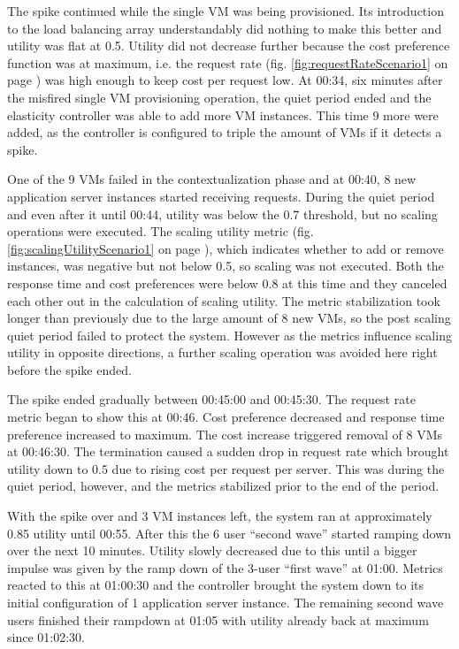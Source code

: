 \documentclass[english]{tktltiki2}
\theoremstyle{definition}
\theoremstyle{remark}
\begin{document}
The spike continued while the single VM was being provisioned. Its introduction
to the load balancing array understandably did nothing to make this better and
utility was flat at 0.5. Utility did not decrease further because the cost
preference function was at maximum, i.e. the request rate (fig.
\ref{fig:requestRateScenario1} on page \pageref{fig:requestRateScenario1}) was
high enough to keep cost per request low. At 00:34, six minutes after the
misfired single VM provisioning operation, the quiet period ended and the
elasticity controller was able to add more VM instances. This time 9 more were
added, as the controller is configured to triple the amount of VMs if it detects
a spike.

One of the 9 VMs failed in the contextualization phase and at 00:40, 8 new
application server instances started receiving requests. During the quiet period
and even after it until 00:44, utility was below the 0.7 threshold, but no
scaling operations were executed. The scaling utility metric (fig.
\ref{fig:scalingUtilityScenario1} on page
\pageref{fig:scalingUtilityScenario1}), which indicates whether to add or remove
instances, was negative but not below 0.5, so scaling was not executed. Both the
response time and cost preferences were below 0.8 at this time and they canceled
each other out in the calculation of scaling utility. The metric stabilization
took longer than previously due to the large amount of 8 new VMs, so the post
scaling quiet period failed to protect the system. However as the metrics
influence scaling utility in opposite directions, a further scaling operation
was avoided here right before the spike ended.

The spike ended gradually between 00:45:00 and 00:45:30. The request rate
metric began to show this at 00:46. Cost preference decreased and response time
preference increased to maximum. The cost increase triggered removal of 8 VMs at
00:46:30. The termination caused a sudden drop in request rate which brought
utility down to 0.5 due to rising cost per request per server. This was during
the quiet period, however, and the metrics stabilized prior to the end of the
period.

With the spike over and 3 VM instances left, the system ran at approximately
0.85 utility until 00:55. After this the 6 user ``second wave'' started ramping
down over the next 10 minutes. Utility slowly decreased due to this until a
bigger impulse was given by the ramp down of the 3-user ``first wave'' at 01:00.
Metrics reacted to this at 01:00:30 and the controller brought the system down
to its initial configuration of 1 application server instance. The remaining
second wave users finished their rampdown at 01:05 with utility already back at
maximum since 01:02:30.
\end{document}
